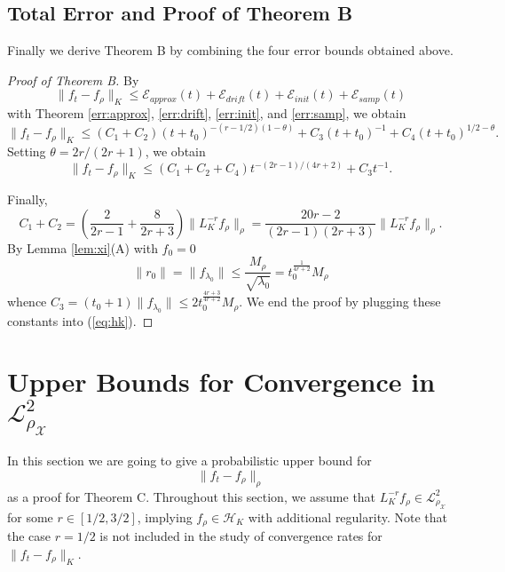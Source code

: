 \documentclass[twoside,11pt]{amsart}
\theoremstyle{theorem}
\theoremstyle{definition}
\theoremstyle{remark}
\def\L{{\mathscr L}}
\def\L2{{\mathscr L}^2_{\rho_\X}}
\def\H{{\mathscr H}}
\def\X{{\mathscr X}}
\def\Err{{\mathscr E}}
\def\t{t_0}
\def\la{\lambda}
\begin{document}
\subsection{Total Error and Proof of Theorem B}

Finally we derive Theorem B by combining the four error bounds obtained above.

\begin{proof}[Proof of Theorem B] By
\[ \|f_t - f_\rho\|_K \leq \Err_{approx}(t) + \Err_{drift}(t)+ \Err_{init}(t)+\Err_{samp}(t) \]
with Theorem \ref{err:approx}, \ref{err:drift}, \ref{err:init}, and \ref{err:samp}, we obtain
\[ \|f_t - f_\rho\|_K \leq (C_1 +C_2)(t+\t)^{-(r-1/2)(1-\theta)}+ C_3 (t+\t)^{-1} + C_4 (t+\t)^{1/2-\theta}. \]
Setting $\theta = 2r/(2r+1)$, we obtain 
\begin{equation} \label{eq:hk}
\|f_t - f_\rho \|_K \leq  (C_1+C_2 + C_4) t^{-(2r-1)/(4r+2)}+  C_3 t^{-1}. 
\end{equation}

Finally,
\[ C_1 + C_2 =  \left(\frac{2}{2r-1}+\frac{8}{2r+3}  \right)\| L^{-r}_K f_\rho \|_\rho=\frac{20r-2}{(2r-1)(2r+3)}\| L^{-r}_K f_\rho \|_\rho. \]
By Lemma \ref{lem:xi}(A) with $f_0=0$
\[ \|r_0\|=\|f_{\la_0}\|\leq \frac{M_\rho}{\sqrt{\la_0}} = \t^{\frac{1}{4r+2}} M_\rho \]
whence $C_3 = (\t+1)\|f_{\la_0}\|\leq 2\t^{\frac{4r+3}{4r+2}} M_\rho$. We end the proof by plugging these constants into (\ref{eq:hk}). 
\end{proof}



\section{Upper Bounds for Convergence in $\L2$} \label{sec:l2}


In this section we are going to give a probabilistic upper bound for
\[ \|f_t - f_\rho \|_\rho \]
as a proof for Theorem C. Throughout this section, we assume 
that $L_K^{-r} f_\rho\in \L2$ for some $r\in [1/2,3/2]$, implying $f_\rho \in \H_K$ with additional regularity. Note that the case $r=1/2$ is not included
in the study of convergence rates for $\|f_t - f_\rho \|_K$. 
\end{document}
